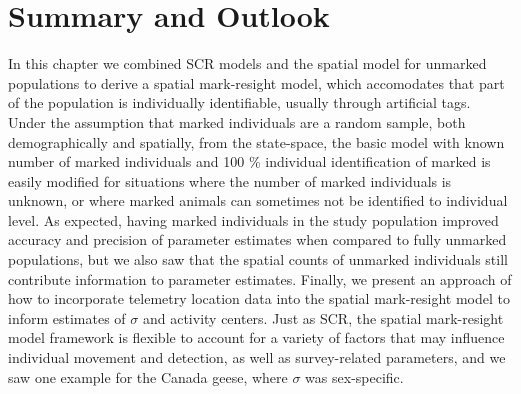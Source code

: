 



\section{Summary and Outlook}
In this chapter we combined SCR models and the spatial model for unmarked populations to derive a spatial mark-resight model, which accomodates that part of the population is individually identifiable, usually through artificial tags. Under the assumption that marked individuals are a random sample, both demographically and spatially, from the state-space, the basic model with known number of marked individuals and 100 \% individual identification of marked is easily modified for situations where the number of marked individuals is unknown, or where marked animals can sometimes not be identified to individual level. As expected, having marked individuals in the study population improved accuracy and precision of parameter estimates when compared to fully unmarked populations, but we also saw that the spatial counts of unmarked individuals still contribute information to parameter estimates. Finally, we present an approach of how to incorporate telemetry location data into the spatial mark-resight model to inform estimates of $\sigma$ and activity centers. Just as SCR, the spatial mark-resight model framework is flexible to account for a variety of factors that may influence individual movement and detection, as well as survey-related parameters, and we saw one example for the Canada geese, where $\sigma$ was sex-specific.

